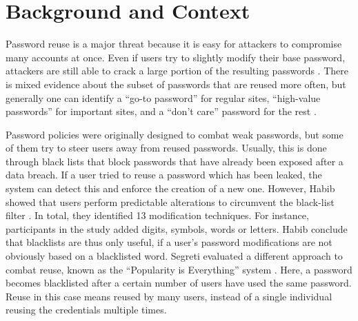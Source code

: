 \section{Background and Context}
Password reuse is a major threat because it is easy for attackers to compromise many accounts at once. Even if users try to slightly modify their base password, attackers are still able to crack a large portion of the resulting passwords \cite{Das2014TangledWeb,Jaeger2016AnalysisOfLeaks}. There is mixed evidence about the subset of passwords that are reused more often, but generally one can identify a ``go-to password'' for regular sites, ``high-value passwords'' for important sites, and a ``don't care'' password for the rest \cite{Bailey2014StatisticsReuse,Stobert2014PasswordLifeCycle, Haque2014Hierarchy, Florencio2007LargeScaleStudyPasswordHabits, Stobert2015ExpertPassword, Ur2015PWCreationLab,Wash2016UnderstandingPasswordChoices}. 

Password policies were originally designed to combat weak passwords, but some of them try to steer users away from reused passwords. Usually, this is done through black lists that block passwords that have already been exposed after a data breach. If a user tried to reuse a password which has been leaked, the system can detect this and enforce the creation of a new one. However, Habib \etal showed that users perform predictable alterations to circumvent the black-list filter \cite{Habib2017Blacklists}. In total, they identified 13 modification techniques. For instance, participants in the study added digits, symbols, words or letters. Habib \etal conclude that blacklists are thus only useful, if a user's password modifications are not obviously based on a blacklisted word. Segreti \etal evaluated a different approach to combat reuse, known as the ``Popularity is Everything'' system \cite{Segreti2017AdaptivePolicies}. Here, a password becomes blacklisted after a certain number of users have used the same password. Reuse in this case means reused by many users, instead of a single individual reusing the credentials multiple times. 

